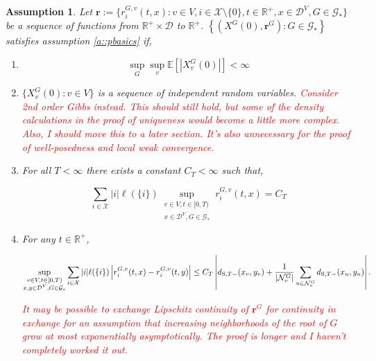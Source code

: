 \documentclass[12pt]{article}
\newcommand{\mb}{\mathbb}
\newcommand{\mc}{\mathcal}
\newcommand{\te}{\text}
\newcommand{\tr}{\textcolor{red}}
\newcommand{\ex}[1]{\mb{E}\left[#1\right]}			%
\newcommand{\defeq}{:=}								%
\newcommand{\cad}{\mc{D}}							%
\newcommand{\sta}{\mc{X}}							%
\newcommand{\gneigh}[2]{\mc{N}^{#1}_{#2}}			%
\newcommand{\Xf}{X}									%
\newcommand{\Sm}{\ell}								%
\newcommand{\rate}{r}								%
\newcommand{\stmet}[1]{
\ifstrempty{#1}{
	d_{\te{S}}}{
	d_{\te{S},#1}}}									%
\newcommand{\xf}{x}									%
\newcommand{\xg}{y}									%
\newcommand{\vind}[1]{_{#1}}						%
\newcommand{\tme}[1]{(#1)}							%
\newcommand{\gind}[1]{^{#1}}						%
\newcommand{\vpara}[1]{^{#1}}						%
\newcommand{\stpara}[1]{_{#1}}						%
\newcommand{\gvpara}[2]{^{#1,#2}}					%
\newcommand{\rateset}{\mathbf{\rate}}				%
\newcommand{\jumpbd}[1]{C_{#1}}						%
\newcommand{\tmepro}[2]{(#1,#2)}					%
\newcommand{\Gs}{\mc{G}_\ast}						%
\newtheorem{assu}[thms]{Assumption}
\begin{document}
\begin{assu}
Let \(\rateset \defeq \{\rate\gvpara{G}{v}\stpara{i}\tmepro{t}{x}:v \in V,i \in \sta\setminus\{0\},t \in \mb{R}^+, x \in \cad\vpara{V}, G \in \Gs\}\) be a sequence of functions from \(\mb{R}^+\times \cad\) to \(\mb{R}^+\). \(\left\{(\Xf\gind{G}\tme{0},\rateset\gind{G}): G \in \Gs\right\}\) satisfies assumption \ref{a::pbasics} if,

\begin{enumerate}
\item 

\begin{equation}
\sup_G\sup_v \ex{|\Xf\gind{G}\vind{v}\tme{0}|} < \infty
\label{a::bddstart}
\end{equation}

\item \(\{\Xf\gind{G}\vind{v}\tme{0}:v \in V\}\) is a sequence of independent random variables. \tr{Consider 2nd order Gibbs instead. This should still hold, but some of the density calculations in the proof of uniqueness would become a little more complex.} \tr{Also, I should move this to a later section. It's also unnecessary for the proof of well-posedness and local weak convergence.}

\item For all \(T < \infty\) there exists a constant \(\jumpbd{T} < \infty\) such that,

\begin{equation}
\sum_{i \in \sta}|i|\Sm(\{i\})\sup_{\substack{v \in V,t \in [0,T)\\\xf \in \cad\vpara{V},G \in \Gs}} \rate\gvpara{G}{v}\stpara{i}\tmepro{t}{\xf} = \jumpbd{T}
\label{a::bddjmp}
\end{equation}

\item For any \(t \in \mb{R}^+\),

\begin{equation}
\sup_{\substack{v \in V,t \in [0,T)\\\xf,\xg \in \cad\vpara{V},G \in \Gs}} \sum_{i \in \sta}|i|\Sm(\{i\})\left|\rate\gvpara{G}{v}\stpara{i}\tmepro{t}{\xf} - \rate\gvpara{G}{v}\stpara{i}\tmepro{t}{\xg}\right| \leq \jumpbd{T}\left|\stmet{T-}(\xf\vind{v},\xg\vind{v}) + \frac{1}{|\gneigh{G}{v}|}\sum_{u\in\gneigh{G}{v}} \stmet{T-}(\xf\vind{u},\xg\vind{u})\right|.
\label{a::Lipschitz}
\end{equation}

\tr{It may be possible to exchange Lipschitz continuity of \(\rateset\gind{G}\) for continuity in exchange for an assumption that increasing neighborhoods of the root of \(G\) grow at most exponentially asymptotically. The proof is longer and I haven't completely worked it out.}


\end{enumerate}
\end{assu}
\end{document}
